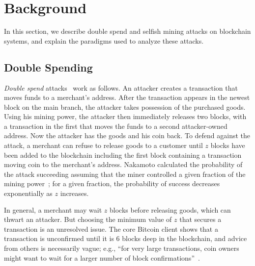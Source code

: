 \section{Background}
In this section, we describe double spend and selfish mining attacks on blockchain systems, and explain the paradigms used to analyze these attacks.

\subsection{Double Spending} 
{\em Double spend} attacks~\cite{Nakamoto:2009} work as follows. An attacker creates a transaction that moves
funds to a merchant's address. After the transaction appears in the
newest block on the main branch, the attacker takes possession of the purchased
goods. Using his mining power, the attacker then immediately releases
two blocks, with a transaction in the first that moves the funds to a
second attacker-owned address. Now the attacker has the goods and his
coin back. To defend against the attack, a merchant can refuse to
release goods to a customer until $z$ blocks have been
added to the blockchain including the first block containing a
transaction moving coin to the merchant's address.  Nakamoto
calculated the probability of the attack succeeding assuming that the
miner controlled a given fraction of the mining power~\cite{Nakamoto:2009};
for a given fraction, the probability of success decreases exponentially as $z$
increases. 

In general, a merchant may wait $z$ blocks before releasing goods,
which can thwart an attacker.
But choosing the minimum value of $z$ that secures a transaction is an
unresolved issue. The core Bitcoin client shows that a transaction is
unconfirmed until it is 6 blocks deep in the
blockchain\cite{bitcoin:confirmation}, and   advice from others is necessarily vague; e.g., ``for very large transactions, coin
owners might want to wait for a larger number of block
confirmations''~\cite{Bonneau:2015a}.   


